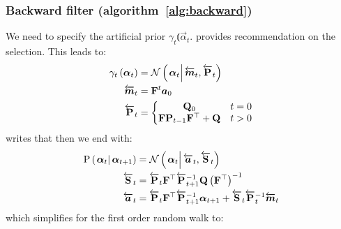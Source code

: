 \subsubsection*{Backward filter (algorithm~\ref{alg:backward})}
We need to specify the artificial prior $\gamma_t\Lparen{\vec{\alpha}_t}$. \citet[page 69 and 70]{briers10} provides recommendation on the selection. This leads to:
\begin{equation}\begin{split}
	\gamma_t\Lparen{\vec{\alpha}_t} &=
		\normalC{\vec{\alpha}_t}{\vecLarrow{m}_t}{\matLarrow{P}_t} \\
%
	\vecLarrow{m}_t &= \mat{F}^t\vec{a}_0 \\
%
	\matLarrow{P}_t &= \left\{
		\begin{matrix} \mat{Q}_0 & t = 0 \\ \mat{F}\mat{P}_{t - 1}\mat{F}^\top + \mat{Q} & t > 0   \end{matrix} \right.
\end{split}\end{equation}
%
%
\cite{fearnhead10} writes that then we end with:
\begin{equation}\begin{split}
	\propC{\vec{\alpha}_t}{\vec{\alpha}_{t+1}} &= 
	\normalC{\vec{\alpha}_t}{\vecLarrow{a}_t}{\matLarrow{S}_t} \\ 
%
	\matLarrow{S}_t &= \matLarrow{P}_t\mat{F}^\top\matLarrow{P}_{t + 1}^{-1}\mat{Q}\Lparen{\mat{F}^\top}^{-1} \\
%
	\vecLarrow{a}_t &= 
		\matLarrow{P}_t\mat{F}^\top\matLarrow{P}_{t + 1}^{-1}\vec{\alpha}_{t+1}
		+ \matLarrow{S}_t\matLarrow{P}_t^{-1} \vecLarrow{m}_t
\end{split}\end{equation}%
%
which simplifies for the first order random walk to:

